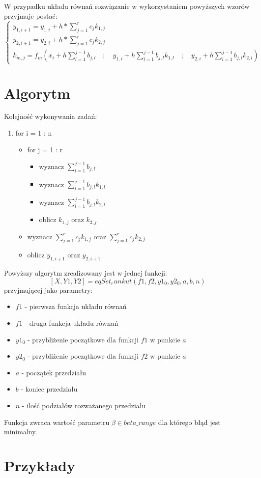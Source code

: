 \documentclass[11pt]{article}
\begin{document}
	W przypadku układu równań rozwiązanie w wykorzystaniem powyższych wzorów przyjmuje postać:
	$$\begin{cases}
	y_{1,i+1} = y_{1,i} + h*\displaystyle\sum_{j=1}^{r}c_jk_{1,j} \\
	
	y_{2,i+1} = y_{2,i} + h*\displaystyle\sum_{j=1}^{r}c_jk_{2,j} \\
	
	k_{m,j}=f_m(x_i+h\displaystyle\sum_{l=1}^{j-1}b_{j,l} \quad;\quad y_{1,i} + h\displaystyle\sum_{l=1}^{j-1}b_{j,l}k_{1,l} \quad;\quad y_{2,i} + h\displaystyle\sum_{l=1}^{j-1}b_{j,l}k_{2,l})
	\end{cases}
	$$
	\section{Algorytm}
	Kolejność wykonywania zadań:
	\begin{enumerate} 
		\item for i = 1 : n
		\begin{itemize}
			\item for j = 1 : r
			\begin{itemize}
				\item wyznacz $\displaystyle\sum_{l=1}^{j-1}b_{j,l}$
				\item wyznacz $\displaystyle\sum_{l=1}^{j-1}b_{j,l}k_{1,l}$
				\item wyznacz $\displaystyle\sum_{l=1}^{j-1}b_{j,l}k_{2,l}$
				\item oblicz $k_{1,j}$ oraz $k_{2,j}$
			\end{itemize}
			\item wyznacz $\displaystyle\sum_{j=1}^{r}c_jk_{1,j}$ oraz $\displaystyle\sum_{j=1}^{r}c_jk_{2,j}$
			\item oblicz $y_{1,i+1}$ oraz $y_{2,i+1}$
		\end{itemize}
	\end{enumerate}
	Powyższy algorytm zrealizowany jest w jednej funkcji:
	$$[X, Y1, Y2] = eqSet_runkut( f1, f2, y1_0, y2_0, a, b, n )$$
	przyjmującej jako parametry:
	\begin{itemize}
		\item $f1$ - pierwsza funkcja układu równań
		\item $f1$ - druga funkcja układu równań
		\item $y1_0$ - przybliżenie początkowe dla funkcji $f1$ w punkcie $a$
		\item $y2_0$ - przybliżenie początkowe dla funkcji $f2$ w punkcie $a$
		\item $a$ - początek przedziału
		\item $b$ - koniec przedziału
		\item $n$ - ilość podziałów rozważanego przedziału
	\end{itemize}
	Funkcja zwraca wartość parametru $\beta \in beta\_range$ dla którego błąd jest minimalny.
	
	\section{Przykłady}
	
\end{document}
